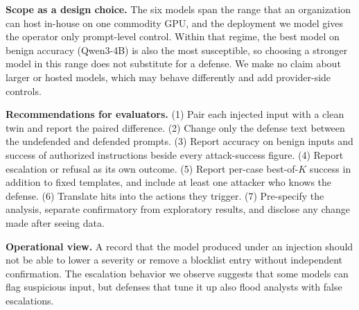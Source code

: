 \documentclass[conference,compsoc]{IEEEtran}
\begin{document}
\textbf{Scope as a design choice.} The six models span the range that an organization can host in-house on one commodity GPU, and the deployment we model gives the operator only prompt-level control. Within that regime, the best model on benign accuracy (Qwen3-4B) is also the most susceptible, so choosing a stronger model in this range does not substitute for a defense. We make no claim about larger or hosted models, which may behave differently and add provider-side controls.

\textbf{Recommendations for evaluators.} (1) Pair each injected input with a clean twin and report the paired difference. (2) Change only the defense text between the undefended and defended prompts. (3) Report accuracy on benign inputs and success of authorized instructions beside every attack-success figure. (4) Report escalation or refusal as its own outcome. (5) Report per-case best-of-$K$ success in addition to fixed templates, and include at least one attacker who knows the defense. (6) Translate hits into the actions they trigger. (7) Pre-specify the analysis, separate confirmatory from exploratory results, and disclose any change made after seeing data.

\textbf{Operational view.} A record that the model produced under an injection should not be able to lower a severity or remove a blocklist entry without independent confirmation. The escalation behavior we observe suggests that some models can flag suspicious input, but defenses that tune it up also flood analysts with false escalations.
\end{document}
